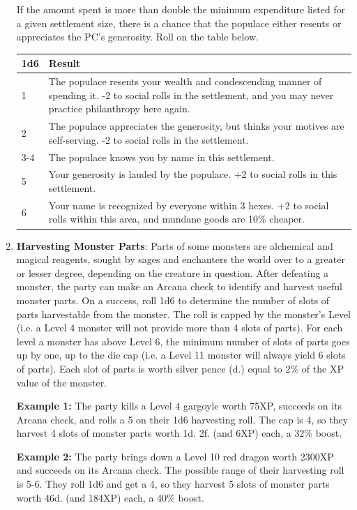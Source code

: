 \documentclass{book}
\begin{document}
\begin{enumerate}
	If the amount spent is more than double the minimum expenditure listed for a given settlement size, there is a chance that the populace either resents or appreciates the PC’s generosity. Roll on the table below.
	
	\begin{table}[H]
		\centering
		\begin{tabular}{p{.25in}p{5in}}
			\toprule
				1d6 & Result\\
			\midrule
				1 & The populace resents your wealth and condescending manner of spending it. -2 to social rolls in the settlement, and you may never practice philanthropy here again.\\
				2 & The populace appreciates the generosity, but thinks your motives are self-serving. -2 to social rolls in the settlement.\\
				3-4 & The populace knows you by name in this settlement.\\
				5 & Your generosity is lauded by the populace. +2 to social rolls in this settlement.\\
				6 & Your name is recognized by everyone within 3 hexes. +2 to social rolls within this area, and mundane goods are 10\% cheaper.\\
		\end{tabular}
	\end{table}
\item
	\textbf{Harvesting Monster Parts}: Parts of some monsters are alchemical and magical reagents, sought by sages and enchanters the world over to a greater or lesser degree, depending on the creature in question. After defeating a monster, the party can make an Arcana check to identify and harvest useful monster parts. On a success, roll 1d6 to determine the number of slots of parts harvestable from the monster. The roll is capped by the monster's Level (i.e. a Level 4 monster will not provide more than 4 slots of parts). For each level a monster has above Level 6, the minimum number of slots of parts goes up by one, up to the die cap (i.e. a Level 11 monster will always yield 6 slots of parts). Each slot of parts is worth silver pence (d.) equal to 2\% of the XP value of the monster.

\textbf{Example 1:} The party kills a Level 4 gargoyle worth 75XP, succeeds on its
Arcana check, and rolls a 5 on their 1d6 harvesting roll. The cap is 4, so
they harvest 4 slots of monster parts worth 1d. 2f. (and 6XP) each, a 32\% boost.

\textbf{Example 2:} The party brings down a Level 10 red dragon worth 2300XP and succeeds
on its Arcana check. The possible range of their harvesting roll is 5-6. They
roll 1d6 and get a 4, so they harvest 5 slots of monster parts worth 46d. (and
184XP) each, a 40\% boost.
\end{enumerate}
\end{document}
